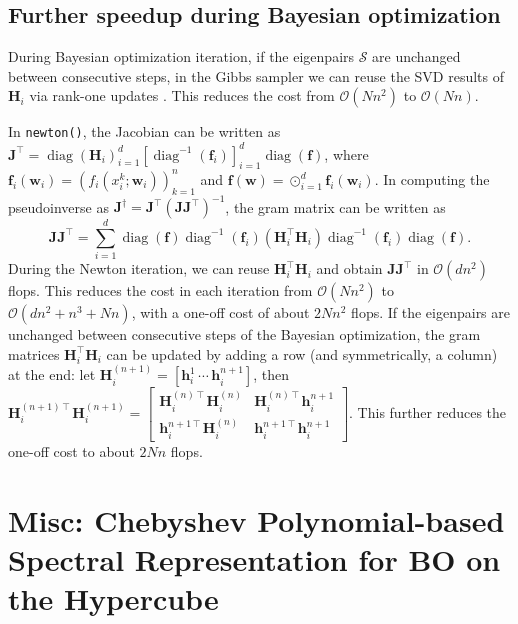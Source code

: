 \documentclass{article}
\DeclareMathOperator{\diag}{diag}
\begin{document}
\subsection{Further speedup during Bayesian optimization}

During Bayesian optimization iteration,
if the eigenpairs $\mathcal{S}$ are unchanged between consecutive steps,
in the Gibbs sampler we can reuse the SVD results of $\mathbf{H}_i$
via rank-one updates \cite{Brand2006}.
This reduces the cost from $\mathcal{O}(N n^2)$ to $\mathcal{O}(N n)$.

In \texttt{newton()}, the Jacobian can be written as
$\mathbf{J}^\intercal = \diag(\mathbf{H}_i)_{i=1}^d [\diag^{-1}(\mathbf{f}_i)]_{i=1}^d \diag(\mathbf{f})$,
where $\mathbf{f}_i(\mathbf{w}_i) = (f_i(x_i^k; \mathbf{w}_i))_{k=1}^n$
and $\mathbf{f}(\mathbf{w}) = \odot_{i=1}^d \mathbf{f}_i(\mathbf{w}_i)$.
In computing the pseudoinverse as
$\mathbf{J}^\dagger = \mathbf{J}^\intercal (\mathbf{J} \mathbf{J}^\intercal)^{-1}$,
the gram matrix can be written as
\begin{equation*}
  \mathbf{J} \mathbf{J}^\intercal =
  \sum_{i=1}^d \diag(\mathbf{f}) \diag^{-1}(\mathbf{f}_i) (\mathbf{H}_i^\intercal \mathbf{H}_i)
  \diag^{-1}(\mathbf{f}_i) \diag(\mathbf{f}).
\end{equation*}
During the Newton iteration, we can reuse $\mathbf{H}_i^\intercal \mathbf{H}_i$
and obtain $\mathbf{J} \mathbf{J}^\intercal$ in $\mathcal{O}(d n^2)$ flops.
This reduces the cost in each iteration from $\mathcal{O}(N n^2)$ to $\mathcal{O}(d n^2 + n^3 + N n)$,
with a one-off cost of about $2 N n^2$ flops.
If the eigenpairs are unchanged between consecutive steps of the Bayesian optimization,
the gram matrices $\mathbf{H}_i^\intercal \mathbf{H}_i$ can be updated by adding a row
(and symmetrically, a column) at the end:
let $\mathbf{H}_i^{(n+1)} = [\mathbf{h}_i^1 \, \cdots \, \mathbf{h}_i^{n+1}]$,
then $\mathbf{H}_i^{(n+1)\intercal} \mathbf{H}_i^{(n+1)} = \begin{bmatrix}
\mathbf{H}_i^{(n)\intercal} \mathbf{H}_i^{(n)} & \mathbf{H}_i^{(n)\intercal} \mathbf{h}_i^{n+1} \\
\mathbf{h}_i^{n+1\intercal} \mathbf{H}_i^{(n)} & \mathbf{h}_i^{n+1\intercal} \mathbf{h}_i^{n+1}
\end{bmatrix}$.
This further reduces the one-off cost to about $2 N n$ flops.


\section{Misc: Chebyshev Polynomial-based Spectral Representation
  for BO on the Hypercube}
\end{document}
